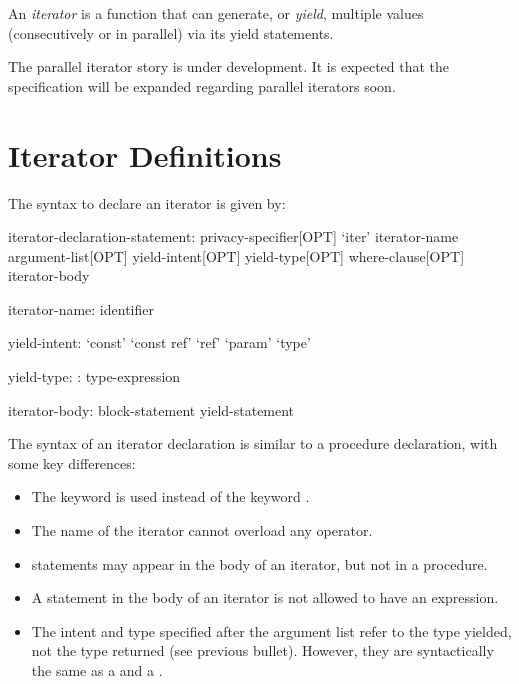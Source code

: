 \label{Iterators}

An \emph{iterator} is a function that can generate, or \emph{yield}, multiple values (consecutively or in parallel) via its yield statements.

\begin{openissue}
The parallel iterator story is under development.  It is expected that
the specification will be expanded regarding parallel iterators soon.
\end{openissue}

\section{Iterator Definitions}
\label{Iterator_Function_Definitions}

The syntax to declare an iterator is given
by:
\begin{syntax}
iterator-declaration-statement:
  privacy-specifier[OPT] `iter' iterator-name argument-list[OPT] yield-intent[OPT] yield-type[OPT] where-clause[OPT]
  iterator-body

iterator-name:
  identifier

yield-intent:
  `const'
  `const ref'
  `ref'
  `param'
  `type'

yield-type:
  : type-expression

iterator-body:
  block-statement
  yield-statement
\end{syntax}

The syntax of an iterator declaration is similar to a procedure declaration, with
some key differences:
\begin{itemize}
\item The keyword  is used instead of the keyword .
\item The name of the iterator cannot overload any operator.
\item {} statements may appear in the body of an iterator, but not in
a procedure.
\item A  statement in the body of an iterator is not allowed to have an expression.
\item The intent and type specified after the argument list refer to the type
yielded, not the type returned (see previous bullet).  However, they are
syntactically the same as a  and a .
\end{itemize}

